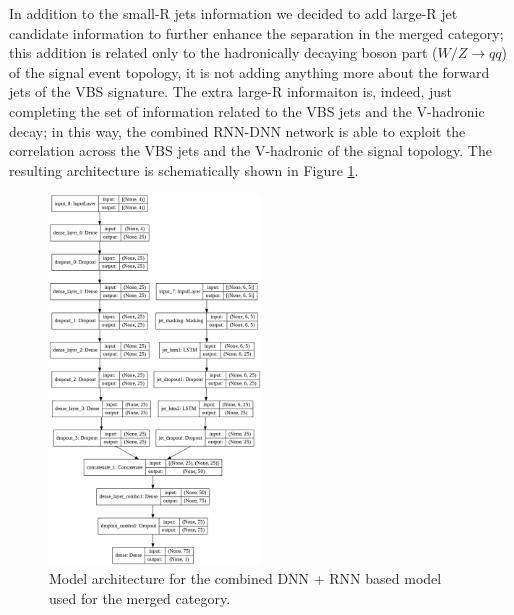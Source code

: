 In addition to the small-R jets information we decided to add large-R jet candidate information to further enhance the separation in the merged category; this addition is related only to the hadronically decaying boson part ($W/Z \rightarrow qq$) of the signal event topology, it is not adding anything more about the forward jets of the VBS signature.
The extra large-R informaiton is, indeed, just completing the set of information related to the VBS jets and the V-hadronic decay; in this way, the combined RNN-DNN network is able to exploit the correlation across the VBS jets and the V-hadronic of the signal topology.
The resulting architecture is schematically shown in Figure \ref{fig:RNNComboArch}.
\begin{figure}[ht]
      \centering
       \includegraphics[width=0.5\textwidth]{figures/RNN/model_plot.png}
       \caption{Model architecture for the combined DNN + RNN based model used for the merged category.}
       \label{fig:RNNComboArch}
\end{figure}

